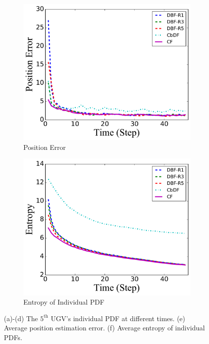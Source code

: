 \documentclass[journal]{IEEEtranTIE}
\theoremstyle{remark}
\begin{document}
\begin{figure}
\begin{subfigure}[b]{0.21\textwidth}
			\includegraphics[width=\textwidth]{hetero_sta_sen_sta_tar_pos_err_16-TIE-3798}
			\caption{Position Error}\label{fig:htr_sta_sen_sta_tar_pos_err}
		\end{subfigure}
		\begin{subfigure}[b]{0.21\textwidth}
			\includegraphics[width=\textwidth]{hetero_sta_sen_sta_tar_entropy_16-TIE-3798}
			\caption{Entropy of Individual PDF}\label{fig:htr_sta_sen_sta_tar_entropy}
		\end{subfigure}
		\caption{(a)-(d) The $5^\text{th}$ UGV's individual PDF at different times. (e) Average position estimation error. (f) Average entropy of individual PDFs.}
		\label{fig:htr_sta_sen_sta_tar}
		\vspace{-1em}
	\end{figure}
	
\end{document}
